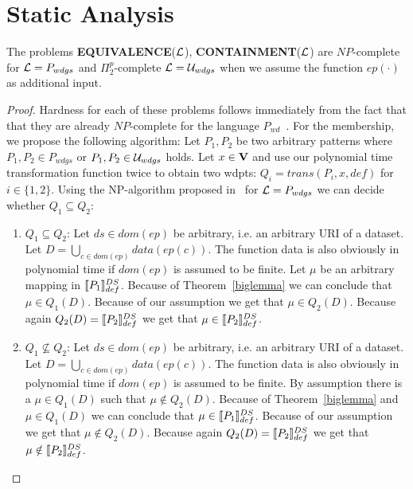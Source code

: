 \section{Static Analysis}
\begin{theorem}
	The problems \textbf{EQUIVALENCE}($\mathcal{L}$), \textbf{CONTAINMENT}($\mathcal{L}$)  
	are $NP$-complete for $\mathcal{L} = P_{wdgs}$ and $\Pi^p_2$-complete $\mathcal{L} =
	\mathcal{U}_{wdgs}$ when we assume the function $ep(\cdot)$ as additional input.
\end{theorem}
\begin{proof}
	Hardness for each of these problems follows immediately from the fact that
	that they are already $NP$-complete for the language
	$P_{wd}$~\cite{letelier2012static}.
	For the membership, we propose the following algorithm:
	Let $P_1,P_2$ be two arbitrary patterns where $P_1,P_2 \in P_{wdgs}$ or
	$P_1,P_2 \in \mathcal{U}_{wdgs}$ holds.
	Let $x \in \mathbf{V}$ and use our polynomial time transformation function twice to obtain two wdpts: 
	$Q_i = trans(P_i,x,def)$ for $i\in \{1,2\}$. 
	Using the NP-algorithm proposed in~\cite{letelier2012static} for $\mathcal{L} =
	P_{wdgs}$ we can decide whether $Q_1 \subseteq Q_2$:
	\begin{enumerate}
		\item $Q_1 \subseteq Q_2$:
			Let $ds \in dom(ep)$ be arbitrary, i.e. an arbitrary URI of a dataset. 
			Let $D =\bigcup\limits_{c\in dom(ep)} data(ep(c))$. The function data is also
			obviously in polynomial time if $dom(ep)$ is assumed to be finite.
			Let $\mu$ be an arbitrary mapping in $\llbracket P_1 \rrbracket^{DS}_{def}$. Because
			of Theorem~\ref{biglemma} we can conclude that $\mu \in Q_1(D)$.
			Because of our assumption we get that $\mu \in Q_2(D)$. Because
			again $Q_2(D) = \llbracket P_2 \rrbracket^{DS}_{def}$ we get that $\mu \in \llbracket P_2
			\rrbracket^{DS}_{def}$.
		\item $Q_1 \not\subseteq Q_2$: 
			Let $ds \in dom(ep)$ be arbitrary, i.e. an arbitrary URI of a dataset. 
			Let $D =\bigcup\limits_{c\in dom(ep)} data(ep(c))$. The function data is also
			obviously in polynomial time if $dom(ep)$ is assumed to be finite.
			By assumption there is a $\mu \in
			Q_1(D)$ such that $\mu \notin Q_2(D)$. Because
			of Theorem~\ref{biglemma} and $\mu \in Q_1(D)$ we can conclude that $\mu \in \llbracket P_1
			\rrbracket^{DS}_{def}$.
			Because of our assumption we get that $\mu \notin Q_2(D)$. Because
			again $Q_2(D) = \llbracket P_2 \rrbracket^{DS}_{def}$ we get that $\mu \notin \llbracket P_2
			\rrbracket^{DS}_{def}$.
	\end{enumerate}
\end{proof}
